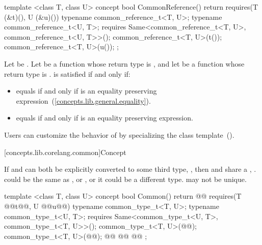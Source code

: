 \begin{addedblock}
{%
\begin{itemdecl}
template <class T, class U>
concept bool CommonReference() {
  return requires(T (&t)(), U (&u)()) {
    typename common_reference_t<T, U>;
    typename common_reference_t<U, T>;
    requires Same<common_reference_t<T, U>,
                  common_reference_t<U, T>>();
    common_reference_t<T, U>(t());
    common_reference_t<T, U>(u());
  };
}
\end{itemdecl}

\begin{itemdescr}
\pnum
Let  be . Let  be a
function whose return type is , and let  be a function
whose return type is .  is satisfied
if and only if:
\begin{itemize}
\item {} equals  if and only if  is an
  equality preserving expression~(\ref{concepts.lib.general.equality}).
\item {} equals  if and only if  is an
  equality preserving expression.
\end{itemize}

\pnum
\enternote Users can customize the behavior of  by specializing the
 class template~().\exitnote
\end{itemdescr}
} %

[concepts.lib.corelang.common]{Concept }

\pnum
If  and  can both be explicitly converted to some third type,
, then  and  share a ,
. \enternote {} could be the same as , or , or
it could be a different type.  may not be unique.\exitnote

%
\begin{itemdecl}
template <class T, class U>
concept bool Common() {
  return @@
    requires(T @\newtxt{(\&}@t@\newtxt{)()}@, U @\newtxt{(\&}@u@\newtxt{)()}@) {
      typename common_type_t<T, U>;
      typename common_type_t<U, T>;
      requires Same<common_type_t<U, T>, common_type_t<T, U>>();
      common_type_t<T, U>(@@);
      common_type_t<T, U>(@@);
      @@
                               @@
                                                  @@
    };
}
\end{itemdecl}


\end{addedblock}
